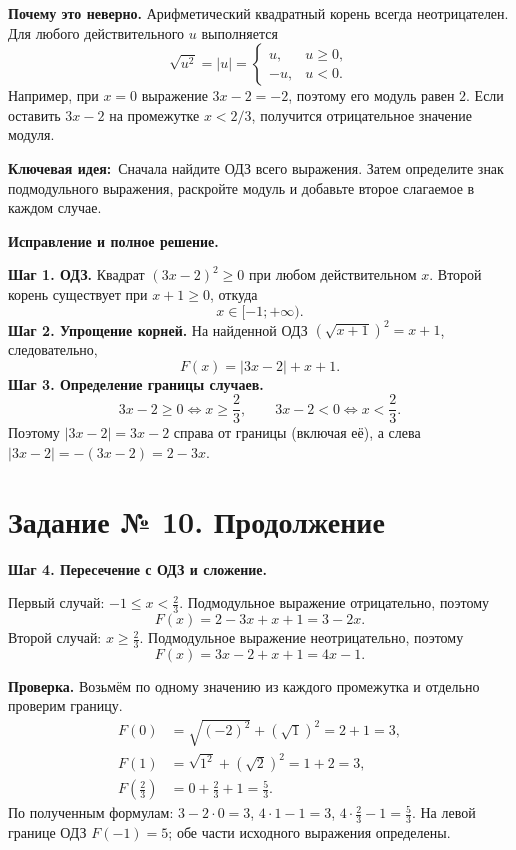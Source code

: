 \documentclass[a4paper,11pt]{article}
\newcommand{\idea}{\textcolor{blue!60!black}{\textbf{Ключевая идея:}}}
\begin{document}
\textbf{Почему это неверно.} Арифметический квадратный корень всегда неотрицателен. Для любого действительного $u$ выполняется
\[
\sqrt{u^2}=|u|=\begin{cases}u,&u\ge0,\\-u,&u<0.\end{cases}
\]
Например, при $x=0$ выражение $3x-2=-2$, поэтому его модуль равен $2$. Если оставить $3x-2$ на промежутке $x<2/3$, получится отрицательное значение модуля.

\idea\ Сначала найдите ОДЗ всего выражения. Затем определите знак подмодульного выражения, раскройте модуль и добавьте второе слагаемое в каждом случае.

\textbf{Исправление и полное решение.}

\textbf{Шаг 1. ОДЗ.} Квадрат $(3x-2)^2\ge0$ при любом действительном $x$. Второй корень существует при $x+1\ge0$, откуда
\[
\boxed{x\in[-1;+\infty)}.
\]
\textbf{Шаг 2. Упрощение корней.} На найденной ОДЗ $(\sqrt{x+1})^2=x+1$, следовательно,
\[
F(x)=|3x-2|+x+1.
\]
\textbf{Шаг 3. Определение границы случаев.}
\[
3x-2\ge0\iff x\ge\frac23,\qquad
3x-2<0\iff x<\frac23.
\]
Поэтому $|3x-2|=3x-2$ справа от границы (включая её), а слева $|3x-2|=-(3x-2)=2-3x$.
\clearpage
\section*{\textcolor{accent}{Задание № 10. Продолжение}}
\textbf{Шаг 4. Пересечение с ОДЗ и сложение.}

Первый случай: $-1\le x<\frac23$. Подмодульное выражение отрицательно, поэтому
\[
F(x)=2-3x+x+1=3-2x.
\]
Второй случай: $x\ge\frac23$. Подмодульное выражение неотрицательно, поэтому
\[
F(x)=3x-2+x+1=4x-1.
\]
\begin{center}
\end{center}
\textbf{Проверка.} Возьмём по одному значению из каждого промежутка и отдельно проверим границу.
\begin{align*}
F(0)&=\sqrt{(-2)^2}+(\sqrt1)^2=2+1=3,\\
F(1)&=\sqrt{1^2}+(\sqrt2)^2=1+2=3,\\
F\left(\frac23\right)&=0+\frac23+1=\frac53.
\end{align*}
По полученным формулам: $3-2\cdot0=3$, $4\cdot1-1=3$, $4\cdot\frac23-1=\frac53$. На левой границе ОДЗ $F(-1)=5$; обе части исходного выражения определены.
\end{document}
